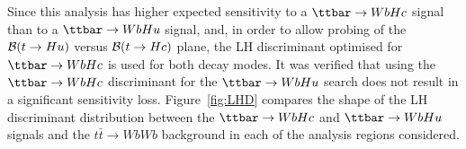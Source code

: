 
Since this analysis has higher expected sensitivity to a $\Hc$ signal than to a $\Hu$ signal, and, in order to allow probing 
of the $\mathcal{B}(t\to Hu)$ versus $\mathcal{B}(t\to Hc)$ plane, the LH discriminant optimised for $\Hc$ is used for both 
decay modes. It was verified that using the $\Hc$ discriminant for the $\Hu$ search does not result in a significant sensitivity loss.
Figure~\ref{fig:LHD} compares the shape of the LH discriminant distribution between the $\Hc$ and $\Hu$ signals and the 
$t\bar{t}\to WbWb$ background in each of the analysis regions considered.

